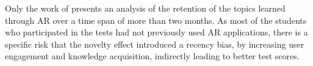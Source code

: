 Only the work of \cite{lin2016effect} presents an analysis of the retention of the topics learned through \gls{AR} over a time span of more than two months. As most of the students who participated in the tests had not previously used \gls{AR} applications, there is a specific risk that the novelty effect introduced a recency bias, by increasing user engagement and knowledge acquisition, indirectly leading to better test scores.